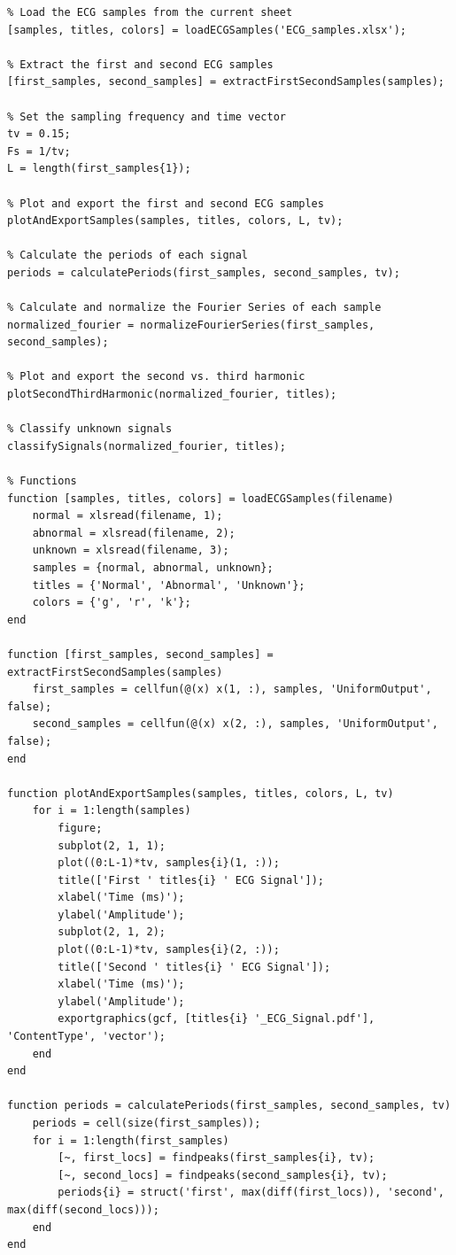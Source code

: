 \documentclass{zc-ust-hw}
\begin{document}
\begin{verbatim}
% Load the ECG samples from the current sheet
[samples, titles, colors] = loadECGSamples('ECG_samples.xlsx');

% Extract the first and second ECG samples
[first_samples, second_samples] = extractFirstSecondSamples(samples);

% Set the sampling frequency and time vector
tv = 0.15;
Fs = 1/tv;
L = length(first_samples{1});

% Plot and export the first and second ECG samples
plotAndExportSamples(samples, titles, colors, L, tv);

% Calculate the periods of each signal
periods = calculatePeriods(first_samples, second_samples, tv);

% Calculate and normalize the Fourier Series of each sample
normalized_fourier = normalizeFourierSeries(first_samples, second_samples);

% Plot and export the second vs. third harmonic
plotSecondThirdHarmonic(normalized_fourier, titles);

% Classify unknown signals
classifySignals(normalized_fourier, titles);

% Functions
function [samples, titles, colors] = loadECGSamples(filename)
    normal = xlsread(filename, 1);
    abnormal = xlsread(filename, 2);
    unknown = xlsread(filename, 3);
    samples = {normal, abnormal, unknown};
    titles = {'Normal', 'Abnormal', 'Unknown'};
    colors = {'g', 'r', 'k'};
end

function [first_samples, second_samples] = extractFirstSecondSamples(samples)
    first_samples = cellfun(@(x) x(1, :), samples, 'UniformOutput', false);
    second_samples = cellfun(@(x) x(2, :), samples, 'UniformOutput', false);
end

function plotAndExportSamples(samples, titles, colors, L, tv)
    for i = 1:length(samples)
        figure;
        subplot(2, 1, 1);
        plot((0:L-1)*tv, samples{i}(1, :));
        title(['First ' titles{i} ' ECG Signal']);
        xlabel('Time (ms)');
        ylabel('Amplitude');
        subplot(2, 1, 2);
        plot((0:L-1)*tv, samples{i}(2, :));
        title(['Second ' titles{i} ' ECG Signal']);
        xlabel('Time (ms)');
        ylabel('Amplitude');
        exportgraphics(gcf, [titles{i} '_ECG_Signal.pdf'], 'ContentType', 'vector');
    end
end

function periods = calculatePeriods(first_samples, second_samples, tv)
    periods = cell(size(first_samples));
    for i = 1:length(first_samples)
        [~, first_locs] = findpeaks(first_samples{i}, tv);
        [~, second_locs] = findpeaks(second_samples{i}, tv);
        periods{i} = struct('first', max(diff(first_locs)), 'second', max(diff(second_locs)));
    end
end


\end{verbatim}
\end{document}
